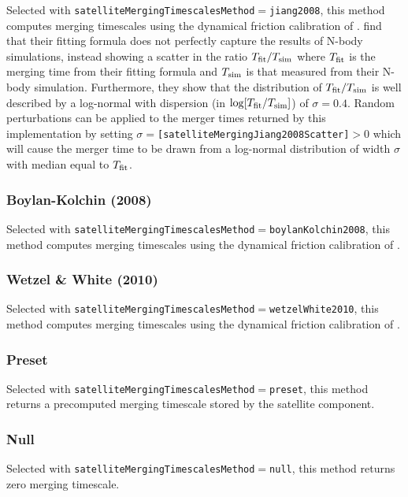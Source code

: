 Selected with {\tt satelliteMergingTimescalesMethod}$=${\tt jiang2008}, this method computes merging timescales using the dynamical friction calibration of \cite{jiang_fitting_2008}. \cite{jiang_fitting_2008} find that their fitting formula does not perfectly capture the results of N-body simulations, instead showing a scatter in the ratio $T_{\rm fit}/T_{\rm sim}$ where $T_{\rm fit}$ is the merging time from their fitting formula and $T_{\rm sim}$ is that measured from their N-body simulation. Furthermore, they show that the distribution of $T_{\rm fit}/T_{\rm sim}$ is well described by a log-normal with dispersion (in $\log[T_{\rm fit}/T_{\rm sim}]$) of $\sigma=0.4$. Random perturbations can be applied to the merger times returned by this implementation by setting $\sigma=${\tt [satelliteMergingJiang2008Scatter]}$>0$ which will cause the merger time to be drawn from a log-normal distribution of width $\sigma$ with median equal to $T_{\rm fit}$.


\subsubsection{Boylan-Kolchin (2008)}

Selected with {\tt satelliteMergingTimescalesMethod}$=${\tt boylanKolchin2008}, this method computes merging timescales using the dynamical friction calibration of \cite{boylan-kolchin_dynamical_2008}.

\subsubsection{Wetzel \& White (2010)}

Selected with {\tt satelliteMergingTimescalesMethod}$=${\tt wetzelWhite2010}, this method computes merging timescales using the dynamical friction calibration of \cite{wetzel_what_2010}.

\subsubsection{Preset}

Selected with {\tt satelliteMergingTimescalesMethod}$=${\tt preset}, this method returns a precomputed merging timescale stored by the satellite component.

\subsubsection{Null}

Selected with {\tt satelliteMergingTimescalesMethod}$=${\tt null}, this method returns zero merging timescale.

